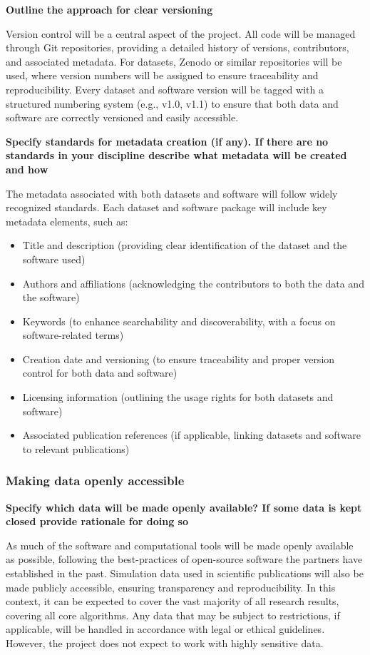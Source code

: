 \documentclass[a4paper,12pt]{article}
\begin{document}
\noindent \textbf{Outline the approach for clear versioning}

Version control will be a central aspect of the project. All code will be managed through Git repositories, providing a detailed history of versions, contributors, and associated metadata. For datasets, Zenodo or similar repositories will be used, where version numbers will be assigned to ensure traceability and reproducibility. Every dataset and software version will be tagged with a structured numbering system (e.g., v1.0, v1.1) to ensure that both data and software are correctly versioned and easily accessible.

\noindent \textbf{Specify standards for metadata creation (if any). If there are no standards in your discipline describe what metadata will be created and how}

The metadata associated with both datasets and software will follow widely recognized standards. Each dataset and software package will include key metadata elements, such as:

\begin{itemize}
    \item Title and description (providing clear identification of the dataset and the software used) 
    \item Authors and affiliations (acknowledging the contributors to both the data and the software) 
    \item Keywords (to enhance searchability and discoverability, with a focus on software-related terms) 
    \item Creation date and versioning (to ensure traceability and proper version control for both data and software) 
    \item Licensing information (outlining the usage rights for both datasets and software)
    \item Associated publication references (if applicable, linking datasets and software to relevant publications) 
\end{itemize}


\subsubsection{Making data openly accessible}

\noindent \textbf{Specify which data will be made openly available? If some data is kept closed provide rationale for doing so}

As much of the software and computational tools will be made openly available as possible, following the best-practices of open-source software the partners have established in the past.  Simulation data used in scientific publications will also be made publicly accessible, ensuring transparency and reproducibility. In this context, it can be expected to cover the vast majority of all research results, covering all core algorithms. Any data that may be subject to restrictions, if applicable, will be handled in accordance with legal or ethical guidelines. However, the project does not expect to work with highly sensitive data.
\end{document}
